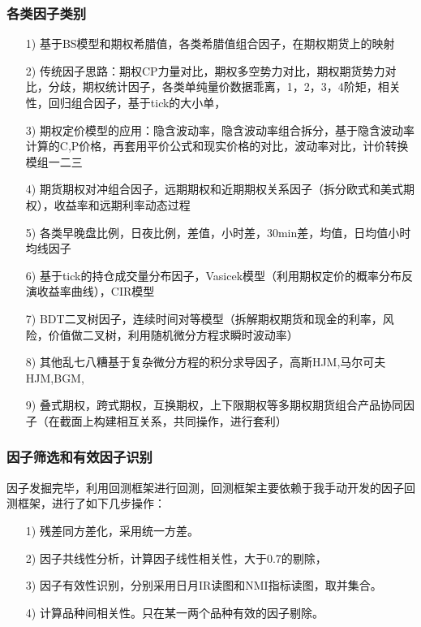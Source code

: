 \documentclass[11pt]{ctexart}
\begin{document}
\subsubsection{各类因子类别}
\begin{itemize}
  \item [1)]
  基于BS模型和期权希腊值，各类希腊值组合因子，在期权期货上的映射
  \item [2)]
  传统因子思路：期权CP力量对比，期权多空势力对比，期权期货势力对比，分歧，期权统计因子，各类单纯量价数据乖离，1，2，3，4阶矩，相关性，回归组合因子，基于tick的大小单，
  \item [3)]
  期权定价模型的应用：隐含波动率，隐含波动率组合拆分，基于隐含波动率计算的C,P价格，再套用平价公式和现实价格的对比，波动率对比，计价转换模组一二三
  \item [4)]
  期货期权对冲组合因子，远期期权和近期期权关系因子（拆分欧式和美式期权），收益率和远期利率动态过程
  \item [5)]
  各类早晚盘比例，日夜比例，差值，小时差，30min差，均值，日均值小时均线因子
  \item [6)]
  基于tick的持仓成交量分布因子，Vasicek模型（利用期权定价的概率分布反演收益率曲线），CIR模型
  \item [7)]
  BDT二叉树因子，连续时间对等模型（拆解期权期货和现金的利率，风险，价值做二叉树，利用随机微分方程求瞬时波动率）
  \item [8)]
  其他乱七八糟基于复杂微分方程的积分求导因子，高斯HJM,马尔可夫HJM,BGM,
  \item [9)]
  叠式期权，跨式期权，互换期权，上下限期权等多期权期货组合产品协同因子（在截面上构建相互关系，共同操作，进行套利）
\end{itemize}

\subsubsection{因子筛选和有效因子识别}
因子发掘完毕，利用回测框架进行回测，回测框架主要依赖于我手动开发的因子回测框架，进行了如下几步操作：
\begin{itemize}
  \item [1)]
  残差同方差化，采用统一方差。
  \item [2)]
  因子共线性分析，计算因子线性相关性，大于0.7的剔除，
  \item [3)]
  因子有效性识别，分别采用日月IR读图和NMI指标读图，取并集合。
  \item [4)]
  计算品种间相关性。只在某一两个品种有效的因子剔除。

\end{itemize}
\end{document}
